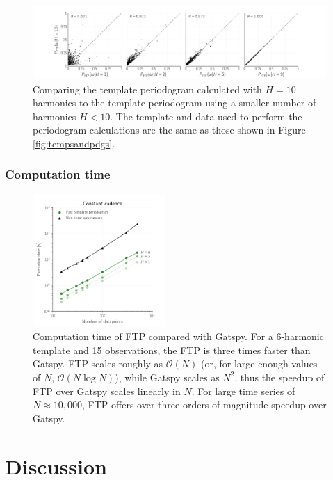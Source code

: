 \documentclass[iop]{emulateapj}
\newcommand{\bigO}{\mathcal{O}}
\begin{document}
\begin{figure}
    \centering
    \includegraphics[width=\textwidth]{plots/correlation_with_large_H.png}
    \caption{\label{fig:corrwgats} Comparing the template periodogram calculated with $H=10$ harmonics
            to the template periodogram using a smaller number of harmonics $H < 10$. The template and
            data used to perform the periodogram calculations are the same as those shown in Figure \ref{fig:tempsandpdgs}.}    
\end{figure}

\subsubsection{Computation time}

\begin{figure}
    \centering
    \includegraphics[width=0.45\textwidth]{plots/timing_vs_ndata.png}
    \caption{\label{fig:timing} Computation time of FTP compared with Gatspy. For a 6-harmonic
             template and 15 observations, the FTP is three times faster than 
             Gatspy. FTP scales roughly as $\bigO(N)$ (or, for large enough values
             of $N$, $\bigO(N\log N)$), while Gatspy scales as $N^2$, thus the speedup of FTP
             over Gatspy scales linearly in $N$. For large time series of $N\approx 10,000$,
             FTP offers over three orders of magnitude speedup over Gatspy.}
\end{figure}

\section{Discussion}









\end{document}
